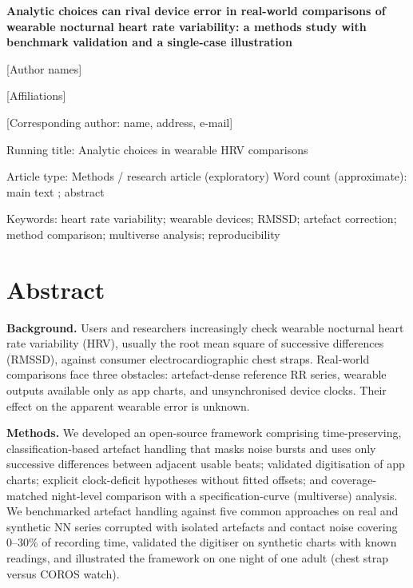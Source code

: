 \documentclass[11pt,a4paper]{article}
\newcommand{\todo}[1]{\textcolor{todo}{\textsf{[#1]}}}
\begin{document}
\thispagestyle{plain}
\begin{flushleft}
{\sffamily\bfseries\LARGE Analytic choices can rival device error in real-world comparisons of wearable nocturnal heart rate variability: a methods study with benchmark validation and a single-case illustration\par}
\vspace{10pt}
{\large \todo{Author names}\par}
\vspace{4pt}
{\small \todo{Affiliations}\par
\todo{Corresponding author: name, address, e-mail}\par
\vspace{4pt}
Running title: Analytic choices in wearable HRV comparisons\par
Article type: Methods / research article (exploratory) \quad
Word count (approximate): main text \wordsMain{}; abstract \wordsAbstract{}\par
Keywords: heart rate variability; wearable devices; RMSSD; artefact correction; method comparison; multiverse analysis; reproducibility\par}
\end{flushleft}

\section*{Abstract}
\textbf{Background.} Users and researchers increasingly check wearable nocturnal heart rate variability (HRV), usually the root mean square of successive differences (RMSSD), against consumer electrocardiographic chest straps. Real-world comparisons face three obstacles: artefact-dense reference RR series, wearable outputs available only as app charts, and unsynchronised device clocks. Their effect on the apparent wearable error is unknown.

\textbf{Methods.} We developed an open-source framework comprising time-preserving, classification-based artefact handling that masks noise bursts and uses only successive differences between adjacent usable beats; validated digitisation of app charts; explicit clock-deficit hypotheses without fitted offsets; and coverage-matched night-level comparison with a specification-curve (multiverse) analysis. We benchmarked artefact handling against five common approaches on real and synthetic NN series corrupted with isolated artefacts and contact noise covering 0--30\% of recording time, validated the digitiser on \nCharts{} synthetic charts with known readings, and illustrated the framework on one night of one adult (chest strap versus COROS watch).
\end{document}
